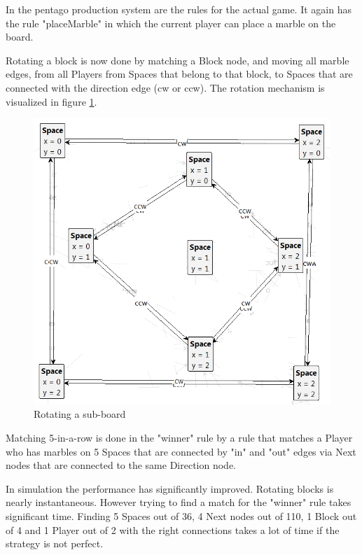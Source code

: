 \vspace{6pt}

In the pentago production system are the rules for the actual game.
It again has the rule "placeMarble" in which the current player can place a marble on the board.

Rotating a block is now done by matching a Block node, and moving all marble edges, from all Players from Spaces that belong to that block, to Spaces that are connected with the direction edge (cw or ccw). The rotation mechanism is visualized in figure \ref{fig:rsb}.

\begin{figure}[!h]
    \centering
    \includegraphics[scale=0.25,clip]{Images/blockforrotation.PNG}
    \caption{Rotating a sub-board}
    \label{fig:rsb}
\end{figure}
\vspace{6pt}

Matching 5-in-a-row is done in the "winner" rule by a rule that matches a Player who has marbles on 5 Spaces that are connected by "in" and "out" edges via Next nodes that are connected to the same Direction node.

In simulation the performance has significantly improved. Rotating blocks is nearly instantaneous. 
However trying to find a match for the "winner" rule takes significant time. 
Finding 5 Spaces out of 36, 4 Next nodes out of 110, 1 Block out of 4 and 1 Player out of 2 with the right connections takes a lot of time if the strategy is not perfect.

